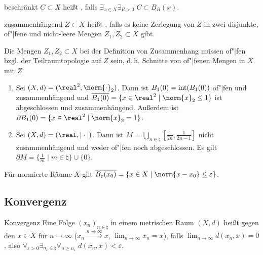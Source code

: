 \begin{Def}{beschränkt}
    $C \subset X$ heißt , falls
    $\exists_{x \in X} \exists_{R > 0}\; C \subset B_R(x)$.
\end{Def}

\begin{Def}{zusammenhängend}
    $Z \subset X$ heißt , falls
    es keine Zerlegung von $Z$ in zwei disjunkte, of"|fene und nicht-leere Mengen
    $Z_1, Z_2 \subset X$ gibt.
\end{Def}

\begin{Bem}
    Die Mengen $Z_1, Z_2 \subset X$ bei der Definition von Zusammenhang müssen of"|fen
    bzgl. der Teilraumtopologie auf $Z$ sein, d.\,h. Schnitte von of"|fenen Mengen in $X$
    mit $Z$.
\end{Bem}

\begin{Bsp}
    \begin{enumerate}[label=\emph{(\alph*)}]
        \item
        Sei $(X, d) = (\real^2, \norm{\cdot}_2)$.
        Dann ist $B_1(0) = \operatorname{int}(B_1(0))$ of"|fen und zusammenhängend und
        $\overline{B_1(0)} = \{x \in \real^2 \;|\; \norm{x}_2 \le 1\}$ ist  abgeschlossen und
        zusammenhängend.
        Außerdem ist $\partial B_1(0) = \{x \in \real^2 \;|\; \norm{x}_2 = 1\}$.
        
        \item
        Sei $(X, d) = (\real, |\cdot|)$.
        Dann ist $M = \bigcup_{n \in \natural} \left[\frac{1}{2n}, \frac{1}{2n-1}\right]$
        nicht zusammenhängend und weder of"|fen noch abgeschlossen.
        Es gilt $\partial M = \{\frac{1}{m} \;|\; m \in \natural\} \cup \{0\}$.
    \end{enumerate}
\end{Bsp}

\begin{Bem}
    Für normierte Räume $X$ gilt
    $\overline{B_\varepsilon(x_0)} = \{x \in X \;|\; \norm{x - x_0} \le \varepsilon\}$.
\end{Bem}

\subsection{%
    Konvergenz%
}

\begin{Def}{Konvergenz}
    Eine Folge $(x_n)_{n \in \natural}$ in einem metrischen Raum $(X, d)$
    heißt  gegen den  $x \in X$ für $n \to \infty$
    ($x_n \xrightarrow{n \to \infty} x$, $\lim_{n \to \infty} x_n = x$), falls
    $\lim_{n \to \infty} d(x_n, x) = 0$,
    also $\forall_{\varepsilon > 0} \exists_{n_\varepsilon \in \natural}
    \forall_{n \ge n_\varepsilon}\; d(x_n, x) < \varepsilon$.
\end{Def}

